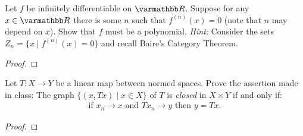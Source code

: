 \section*{}

\begin{exercise}
Let $f$ be infinitely differentiable on $\bfR$. Suppose for any $x \in \bfR$ there is some $n$ such that $f^{(n)}(x) = 0$ (note that $n$ may depend on $x$). Show that $f$ must be a polynomial. \textit{Hint:} Consider the sets $Z_n = \{x \mid f^{(n)}(x) = 0\}$ and recall Baire's Category Theorem.
\end{exercise}
    {\color{red} \begin{proof}
        
    \end{proof}}

\begin{exercise}
Let $T:X \rightarrow Y$ be a linear map between normed spaces. Prove the assertion made in class: The graph $\{(x,Tx) \mid x \in X\}$ of $T$ is \textit{closed} in $X \times Y$ if and only if:
    \begin{equation*}
    \begin{split}
        \text{if }x_n \rightarrow x \text{ and }Tx_n \rightarrow y \text{ then }y = Tx.
    \end{split}
    \end{equation*}
\end{exercise}
    {\color{red} \begin{proof}
        
    \end{proof}}

